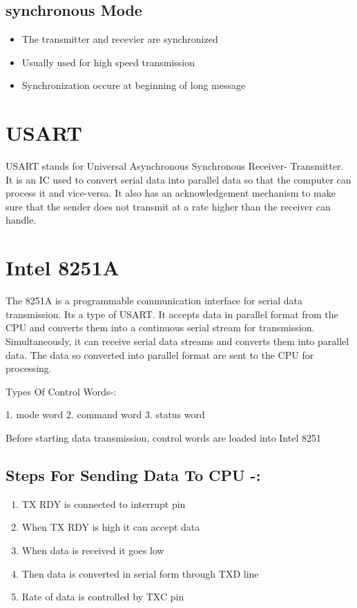 \documentclass[12pt]{report}
\begin{document}
\subsection{synchronous Mode}

\begin{itemize}
\item{The transmitter and recevier are synchronized}
\item{Usually used for high speed transmission}
\item{Synchronization occure at beginning of long message}
\end{itemize}

\section{USART}
 
USART stands for Universal Asynchronous Synchronous Receiver- Transmitter. It is an IC used to convert serial data into parallel data so that the computer can process it and vice-versa. It also has an acknowledgement mechanism to make sure that the sender does not transmit at a rate higher than the receiver can handle.

\section{Intel 8251A} 
The 8251A is a programmable communication interface for serial data transmission. Its a type of USART. It accepts data in parallel format from the CPU and converts them into a continuous serial stream for transmission. Simultaneously, it can receive serial data streams and converts them into parallel data. The data so converted into parallel format are sent to the CPU for processing.



Types Of Control Words-:

1. mode word
2. command word
3. status word 

Before starting data transmission, control words are loaded into Intel 8251 


\subsection{Steps For Sending Data To CPU -:}
\begin{enumerate}
	\item TX RDY is connected to interrupt pin
	\item When TX RDY is high it can accept data
	\item When data is received it goes low
	\item Then data is converted in serial form through TXD line
	\item Rate of data is controlled by TXC pin
\end{enumerate}
\end{document}

